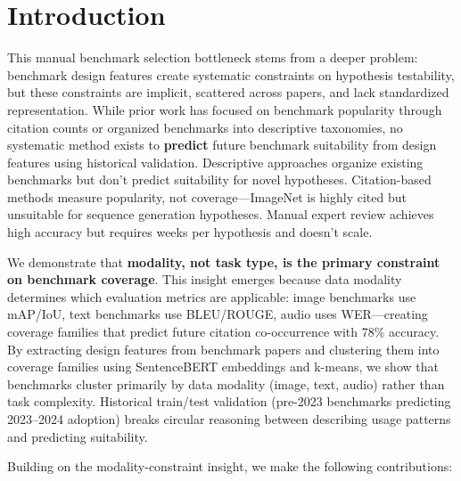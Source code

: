 \section{Introduction}

This manual benchmark selection bottleneck stems from a deeper problem: benchmark design features create systematic constraints on hypothesis testability, but these constraints are implicit, scattered across papers, and lack standardized representation. While prior work has focused on benchmark popularity through citation counts or organized benchmarks into descriptive taxonomies, no systematic method exists to \textbf{predict} future benchmark suitability from design features using historical validation. Descriptive approaches organize existing benchmarks but don't predict suitability for novel hypotheses. Citation-based methods measure popularity, not coverage---ImageNet is highly cited but unsuitable for sequence generation hypotheses. Manual expert review achieves high accuracy but requires weeks per hypothesis and doesn't scale.

We demonstrate that \textbf{modality, not task type, is the primary constraint on benchmark coverage}. This insight emerges because data modality determines which evaluation metrics are applicable: image benchmarks use mAP/IoU, text benchmarks use BLEU/ROUGE, audio uses WER---creating coverage families that predict future citation co-occurrence with 78\% accuracy. By extracting design features from benchmark papers and clustering them into coverage families using SentenceBERT embeddings and k-means, we show that benchmarks cluster primarily by data modality (image, text, audio) rather than task complexity. Historical train/test validation (pre-2023 benchmarks predicting 2023--2024 adoption) breaks circular reasoning between describing usage patterns and predicting suitability.

Building on the modality-constraint insight, we make the following contributions:

